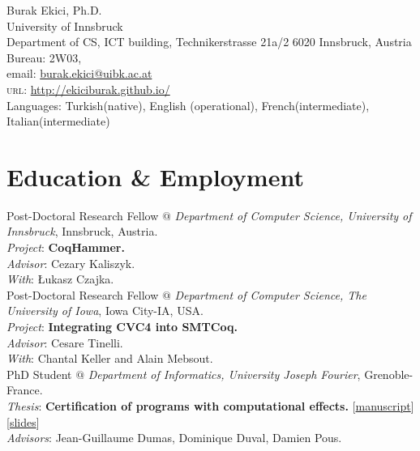 \documentclass[12pt, a4paper]{article}
\newcommand{\years}[1]{\marginnote{\scriptsize #1}}
\begin{document}
{\LARGE Burak Ekici, Ph.D.}\\[0.25cm]
University of Innsbruck\\
Department of CS, ICT building, Technikerstrasse 21a/2 6020 Innsbruck, Austria \\
Bureau:  2W03,\\
email: \href{mailto:burak.ekici@uibk.ac.at}{burak.ekici@uibk.ac.at}\\
\textsc{url}: \href{http://ekiciburak.github.io/}{http://ekiciburak.github.io/}\\ [0.1cm]
Languages: Turkish(native), English (operational), French(intermediate), Italian(intermediate)

\section*{Education \& Employment}

\years{\normalsize2018-now} Post-Doctoral Research Fellow $@$ \textit{Department of Computer Science, University of Innsbruck}, Innsbruck, Austria.\\
\emph{Project}: \textbf{CoqHammer.}\\
\emph{Advisor}: Cezary Kaliszyk.\\
\emph{With}: \L ukasz Czajka.\\

\years{\normalsize2016-2017} Post-Doctoral Research Fellow $@$ \textit{Department of Computer Science, The University of Iowa}, Iowa City-IA, USA.\\
\emph{Project}: \textbf{Integrating CVC4 into SMTCoq.}\\
\emph{Advisor}: Cesare Tinelli.\\
\emph{With}: Chantal Keller and Alain Mebsout.\\

\years{\normalsize2013-2015} PhD Student $@$ \textit{Department of Informatics, University Joseph Fourier}, Grenoble-France.\\
\emph{Thesis}: \textbf{Certification of programs with computational effects.}
 [\href{https://tel.archives-ouvertes.fr/tel-01250842v1/document}{manuscript}]
 [\href{http://ljk.imag.fr/membres/Burak.Ekici/PHDTHESIS/ekici_defense_slides.pdf}{slides}]
 \\
\emph{Advisors}: Jean-Guillaume Dumas, Dominique Duval, Damien Pous.\\
\end{document}

